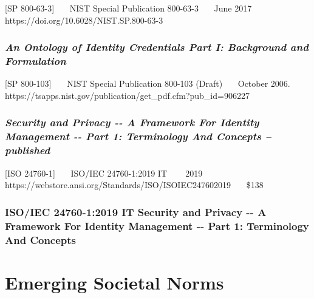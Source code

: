 {[}SP 800-63-3{]}~~~ NIST Special Publication 800-63-3~~~ June 2017~~~
https://doi.org/10.6028/NIST.SP.800-63-3~~~

\hypertarget{an-ontology-of-identity-credentials-part-i-background-and-formulation}{%
\subsubsection{\texorpdfstring{\emph{An Ontology of Identity Credentials
Part I: Background and
Formulation}}{An Ontology of Identity Credentials Part I: Background and Formulation}}\label{an-ontology-of-identity-credentials-part-i-background-and-formulation}}

{[}SP 800-103{]}~~~ NIST Special Publication 800-103 (Draft)~~~ October
2006.~~~
https://tsapps.nist.gov/publication/get\_pdf.cfm?pub\_id=906227~~~

\hypertarget{security-and-privacy----a-framework-for-identity-management----part-1-terminology-and-concepts-published}{%
\subsubsection{\texorpdfstring{\emph{Security and Privacy -\/- A Framework
For Identity Management -\/- Part 1: Terminology And Concepts --
published}}{Security and Privacy -\/- A Framework For Identity Management -\/- Part 1: Terminology And Concepts -- published}}\label{security-and-privacy----a-framework-for-identity-management----part-1-terminology-and-concepts-published}}

{[}ISO 24760-1{]}~~~ ISO/IEC 24760-1:2019 IT ~~~ 2019~~~
https://webstore.ansi.org/Standards/ISO/ISOIEC247602019~~~ \$138

\hypertarget{isoiec-24760-12019-it-security-and-privacy----a-framework-for-identity-management----part-1-terminology-and-concepts}{%
\subsubsection{ISO/IEC 24760-1:2019 IT Security and Privacy -\/- A Framework
For Identity Management -\/- Part 1: Terminology And
Concepts}\label{isoiec-24760-12019-it-security-and-privacy----a-framework-for-identity-management----part-1-terminology-and-concepts}}

\hypertarget{emerging-societal-norms}{%
\section{Emerging Societal Norms}\label{emerging-societal-norms}}

